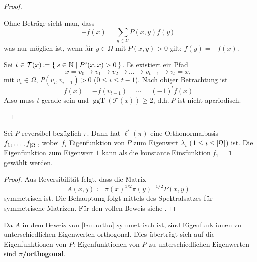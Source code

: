 \documentclass[ngerman,a4paper,11pt]{scrartcl}
\newcommand{\NN}{\mathbb{N}}
\DeclarePairedDelimiter{\abs}{\lvert}{\rvert}		%
\DeclareMathOperator{\ggT}{ggT}
\begin{document}
\begin{proof}
\begin{thmlist}
    Ohne Beträge sieht man, dass
    \begin{equation*}
     -f(x)=\sum_{y\in\Omega}P(x,y)f(y)
    \end{equation*}
   was nur möglich ist, wenn für $y\in\Omega$ mit $P(x,y)>0$ gilt: $f(y)=-f(x)$. 
   
   Sei $t\in\mathcal{T}(x)\coloneqq\Set{s\in\NN\mid P^s(x,x)>0}$. Es existiert
   ein Pfad
   \begin{equation*}
     x=v_0\rightarrow v_1\rightarrow v_2\rightarrow\dotso\rightarrow v_{t-1}\rightarrow v_t=x, 
   \end{equation*}
   mit $v_i\in\Omega$, $P(v_i, v_{i+1})>0$ ($0\leq i\leq t-1$). Nach obiger
   Betrachtung ist 
   \begin{equation*}
    f(x)=-f(v_{t-1})=\dotsb=(-1)^tf(x) 
   \end{equation*}
   Also muss $t$ gerade sein und $\ggT(\mathcal{T}(x))\geq 2$, d.h. $P$ ist
   nicht aperiodisch.
  \end{thmlist}
\end{proof}

\begin{lem}
 \label{lem:ortho}
 Sei $P$ reversibel bezüglich $\pi$. Dann hat $\ell^2(\pi)$  eine
 Orthonormalbasis $f_1,\dotsc ,f_{\abs{\Omega}}$, wobei $f_i$ Eigenfunktion von
 $P$ zum Eigenwert $\lambda_i$ ($1\leq i\leq\abs{\Omega}$) ist. Die
 Eigenfunktion zum Eigenwert $1$ kann als die konstante Einsfunktion $f_1=\mathbf{1}$ gewählt werden.
\end{lem}
\begin{proof}
 Aus Reversibilität folgt, dass die Matrix
 \begin{equation*}
  A(x,y)\coloneqq\pi(x)^{1/2}\pi(y)^{-1/2}P(x,y) 
 \end{equation*}
 symmetrisch ist. Die Behauptung folgt mittels des Spektralsatzes für
 symmetrische Matrizen. Für den vollen Beweis siehe \cite[Lemma~12.2(i)]{lpw}.
\end{proof}

\begin{rem}
 \label{rem:eigortho}
 Da $A$ in dem Beweis von \cref{lem:ortho} symmetrisch ist, sind Eigenfunktionen
 zu unterschiedlichen Eigenwerten orthogonal. Dies überträgt sich auf die
 Eigenfunktionen von $P$: Eigenfunktionen von $P$ zu unterschiedlichen
 Eigenwerten sind \textbf{$\pi$\=/orthogonal}.
\end{rem}
\end{document}
